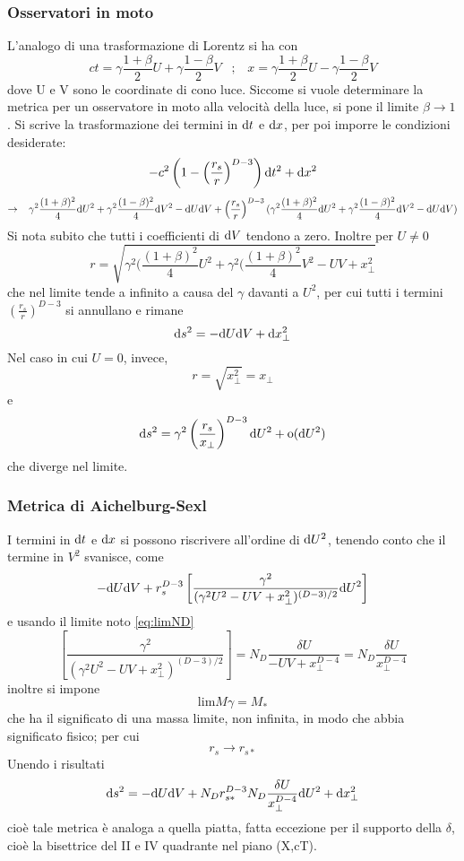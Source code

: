 \subsubsection{Osservatori in moto}
L'analogo di una trasformazione di Lorentz si ha con
\[ ct = \gamma \frac{1+\beta}{2}U + \gamma \frac{1-\beta}{2}V \;\;\; ; \;\;\; x = \gamma \frac{1+\beta}{2}U - \gamma \frac{1-\beta}{2}V \]
dove U e V sono le coordinate di cono luce. Siccome si vuole determinare la metrica per un osservatore in moto alla velocit\`a della luce,  si pone il limite \( \beta \rightarrow 1 \).
Si scrive la trasformazione dei termini in $\mathrm{d} t$ e $\mathrm{d} x$, per poi imporre le condizioni desiderate:
\[ -c^2 \left( 1- \left(\frac{r_s}{r}\right)^{D-3} \right) \mathrm{d} t^2 +  \mathrm{d} x^2 \] 
\[ \rightarrow \;\;\; \gamma^2 \frac{(1+\beta)^2}{4} \mathrm{d} U^2 + \gamma^2 \frac{(1-\beta)^2}{4} \mathrm{d} V^2 - \mathrm{d} U\mathrm{d} V + \left(\frac{r_s}{r}\right)^{D-3}(\gamma^2 \frac{(1+\beta)^2}{4} \mathrm{d} U^2 + \gamma^2 \frac{(1-\beta)^2}{4} \mathrm{d} V^2 - \mathrm{d} U\mathrm{d} V) \]
Si nota subito che tutti i coefficienti di $\mathrm{d} V$ tendono a zero. Inoltre per \(U\neq 0\)
\[ r = \sqrt{ \gamma^2 (\frac{(1+\beta)^2}{4} U^2 +  \gamma^2 (\frac{(1+\beta)^2}{4} V^2 - UV +   x^2_\perp} \]
che nel limite tende a infinito a causa del $\gamma$ davanti a $U^2$, per cui tutti i termini $\left(\frac{r_s}{r}\right)^{D-3}$ si annullano e rimane
\[ \mathrm{d} s^2 = -\mathrm{d} U\mathrm{d} V + \mathrm{d} x^2_\perp \]
Nel caso in cui \(U=0\), invece, 
\[ r = \sqrt{  x^2_\perp } = x_\perp\]
e 
\[ \mathrm{d} s^2 = \gamma^2  \left(\frac{r_s}{x_\perp}\right)^{D-3} \mathrm{d} U^2 + \mathrm{o}(\mathrm{d} U^2) \]
che diverge nel limite.

\subsubsection{Metrica di Aichelburg-Sexl}
I termini in $\mathrm{d} t$ e $\mathrm{d} x$ si possono riscrivere all'ordine di $\mathrm{d} U^2$, tenendo conto che il termine in $V^2$ svanisce, come
\[ -\mathrm{d} U\mathrm{d} V + r_s^{D-3} \left[ \frac{\gamma^2}{ (\gamma^2 U^2 - UV + x_\perp^2)^{(D-3)/2} } \mathrm{d} U^2 \right] \]
e usando il limite noto \ref{eq:limND}
\[ \left[ \frac{\gamma^2}{ (\gamma^2 U^2 - UV + x_\perp^2)^{(D-3)/2} } \right] =  N_D \frac{\delta{U}}{-UV + x_\perp^{D-4}} =  N_D \frac{\delta{U}}{ x_\perp^{D-4}} \]
inoltre si impone 
\[ \mathrm{lim} M \gamma = M_* \]
che ha il significato di una massa limite, non infinita, in modo che abbia significato fisico;
per cui 
\[r_s \rightarrow r_{s*} \]
Unendo i risultati 
\[ \mathrm{d} s^2 = -\mathrm{d} U\mathrm{d} V + N_D r_{s*}^{D-3} N_D \frac{\delta{U}}{ x_\perp^{D-4}} \mathrm{d} U^2 + \mathrm{d} x_\perp^2 \]
cio\`e tale metrica \`e analoga a quella piatta, fatta eccezione per il supporto della $\delta$, cio\`e la bisettrice del II e IV quadrante nel piano (X,cT).

